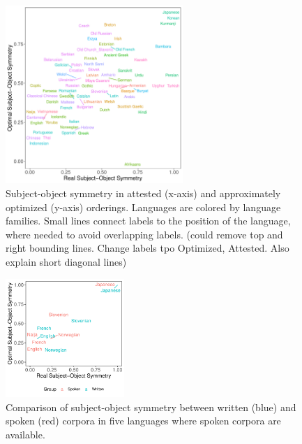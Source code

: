 \documentclass[11pt,a4paper]{article}
\newcommand\comment[1]{{\color{red}#1}}
\newcommand\mhahn[1]{{\color{red}(#1)}}
\begin{document}



\begin{figure}
    \centering
    \includegraphics[width=0.6\textwidth]{../analysis/figures/fracion-optimized_DLM_2.6_format.pdf}
    \caption{Subject-object symmetry in attested (x-axis) and approximately optimized (y-axis) orderings. Languages are colored by language families. Small lines connect labels to the position of the language, where needed to avoid overlapping labels. \mhahn{could remove top and right bounding lines. Change labels tpo Optimized, Attested. Also explain short diagonal lines}}
    \label{fig:study1}
\end{figure}

\begin{figure}
    \centering
    \includegraphics[width=0.4\textwidth]{../analysis/analysis_spoken/spoken.pdf}
    \caption{Comparison of subject-object symmetry between written (blue) and spoken (red) corpora in five languages where spoken corpora are available.}
    \label{fig:spoken}
\end{figure}
\end{document}
